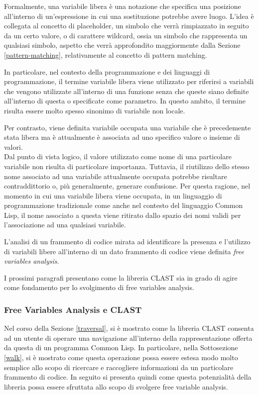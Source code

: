 Formalmente, una variabile libera è una notazione che specifica una posizione
all'interno di un'espressione in cui una sostituzione potrebbe avere luogo.
L'idea è collegata al concetto di placeholder, un simbolo che verrà rimpiazzato
in seguito da un certo valore, o di carattere wildcard, ossia un simbolo che
rappresenta un qualsiasi simbolo, aspetto che verrà approfondito maggiormente
dalla Sezione \ref{pattern-matching}, relativamente al concetto di pattern
matching.

In particolare, nel contesto della programmazione e dei linguaggi di
programmazione, il termine variabile libera viene utilizzato per riferirsi a
variabili che vengono utilizzate all'interno di una funzione senza che queste
siano definite all'interno di questa o specificate come parametro. In questo
ambito, il termine risulta essere molto spesso sinonimo di variabile non
locale.

Per contrasto, viene definita variabile occupata una variabile che è
precedemente stata libera ma è attualmente è associata ad uno specifico valore o
insieme di valori.\\

Dal punto di vista logico, il valore utilizzato come nome di una particolare
variabile non risulta di particolare importanza. Tuttavia, il riutilizzo dello
stesso nome associato ad una variabile attualmente occupata potrebbe risultare
contraddittorio o, più generalmente, generare confusione. Per questa ragione,
nel momento in cui una variabile libera viene occupata, in un linguaggio di
programmazione tradizionale come anche nel contesto del linguaggio Common Lisp,
il nome associato a questa viene ritirato dallo spazio dei nomi validi per
l'associazione ad una qualsiasi variabile.

L'analisi di un frammento di codice mirata ad identificare la presenza e
l'utilizzo di variabili libere all'interno di un dato frammento di codice viene
definita \textit{free variables analysis}.

I prossimi paragrafi presentano come la libreria CLAST sia in grado di agire
come fondamento per lo svolgimento di free variables analysis.\\

\subsubsection{Free Variables Analysis e CLAST}

Nel corso della Sezione \ref{traversal}, si è mostrato come la libreria CLAST
consenta ad un utente di operare una navigazione all'interno della
rappresentazione offerta da questa di un programma Common Lisp. In particolare,
nella Sottosezione \ref{walk}, si è mostrato come questa operazione possa essere
estesa modo molto semplice allo scopo di ricercare e raccogliere informazioni da
un particolare frammento di codice. In seguito si presenta quindi come questa
potenzialità della libreria possa essere sfruttata allo scopo di svolgere free
variable analysis.

